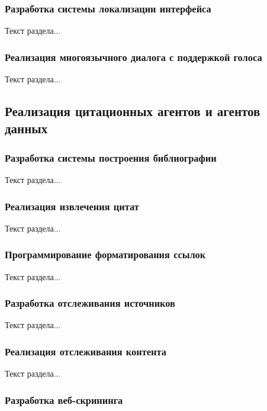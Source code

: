 \subsubsection{Разработка системы локализации интерфейса}

Текст раздела...

\subsubsection{Реализация многоязычного диалога с поддержкой голоса}

Текст раздела...

\subsection{Реализация цитационных агентов и агентов данных}

\subsubsection{Разработка системы построения библиографии}

Текст раздела...

\subsubsection{Реализация извлечения цитат}

Текст раздела...

\subsubsection{Программирование форматирования ссылок}

Текст раздела...

\subsubsection{Разработка отслеживания источников}

Текст раздела...

\subsubsection{Реализация отслеживания контента}

Текст раздела...

\subsubsection{Разработка веб-скрининга}

